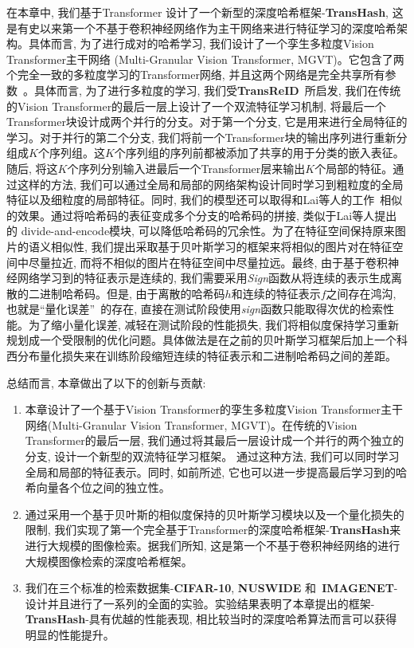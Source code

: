 在本章中, 我们基于Transformer 设计了一个新型的深度哈希框架-\textbf{TransHash}, 这是有史以来第一个不基于卷积神经网络作为主干网络来进行特征学习的深度哈希架构。具体而言, 为了进行成对的哈希学习, 我们设计了一个孪生多粒度Vision Transformer主干网络 (Multi-Granular Vision Transformer, MGVT)。它包含了两个完全一致的多粒度学习的Transformer网络, 并且这两个网络是完全共享所有参数~\cite{bromley1993signature}。具体而言, 为了进行多粒度的学习, 我们受\textbf{TransReID}~\cite{he2021transreid}所启发, 我们在传统的Vision Transformer的最后一层上设计了一个双流特征学习机制, 将最后一个Transformer块设计成两个并行的分支。对于第一个分支, 它是用来进行全局特征的学习。对于并行的第二个分支, 我们将前一个Transformer块的输出序列进行重新分组成$K$个序列组。这$K$个序列组的序列前都被添加了共享的用于分类的嵌入表征。随后, 将这$K$个序列分别输入进最后一个Transformer层来输出$K$个局部的特征。通过这样的方法, 我们可以通过全局和局部的网络架构设计同时学习到粗粒度的全局特征以及细粒度的局部特征。同时, 我们的模型还可以取得和Lai等人的工作~\cite{lai2015simultaneous}相似的效果。通过将哈希码的表征变成多个分支的哈希码的拼接, 类似于Lai等人提出的 divide-and-encode模块, 可以降低哈希码的冗余性。为了在特征空间保持原来图片的语义相似性, 我们提出采取基于贝叶斯学习的框架来将相似的图片对在特征空间中尽量拉近, 而将不相似的图片在特征空间中尽量拉远。最终, 由于基于卷积神经网络学习到的特征表示是连续的, 我们需要采用\textit{Sign}函数从将连续的表示生成离散的二进制哈希码。但是, 由于离散的哈希码$h$和连续的特征表示$f$之间存在鸿沟, 也就是``量化误差''~\cite{zhu2016deep}的存在, 直接在测试阶段使用\textit{sign}函数只能取得次优的检索性能。为了缩小量化误差, 减轻在测试阶段的性能损失, 我们将相似度保持学习重新规划成一个受限制的优化问题。具体做法是在之前的贝叶斯学习框架后加上一个科西分布量化损失来在训练阶段缩短连续的特征表示和二进制哈希码之间的差距。\par
总结而言, 本章做出了以下的创新与贡献:
\begin{enumerate}
    \item 本章设计了一个基于Vision Transformer的孪生多粒度Vision Transformer主干网络(Multi-Granular Vision Transformer, MGVT)。在传统的Vision Transformer的最后一层, 我们通过将其最后一层设计成一个并行的两个独立的分支, 设计一个新型的双流特征学习框架。 通过这种方法, 我们可以同时学习全局和局部的特征表示。同时, 如前所述, 它也可以进一步提高最后学习到的哈希向量各个位之间的独立性。
    \item 通过采用一个基于贝叶斯的相似度保持的贝叶斯学习模块以及一个量化损失的限制, 我们实现了第一个完全基于Transformer的深度哈希框架-\textbf{TransHash}来进行大规模的图像检索。据我们所知, 这是第一个不基于卷积神经网络的进行大规模图像检索的深度哈希框架。
    \item 我们在三个标准的检索数据集-\textbf{CIFAR-10}, \textbf{NUSWIDE} 和~\textbf{IMAGENET}-设计并且进行了一系列的全面的实验。实验结果表明了本章提出的框架-\textbf{TransHash}-具有优越的性能表现, 相比较当时的深度哈希算法而言可以获得明显的性能提升。
\end{enumerate}

